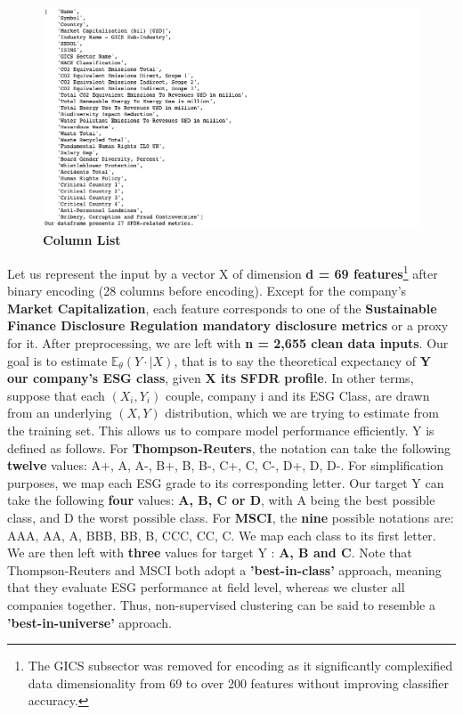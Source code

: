 \documentclass[12pt]{report}
\begin{document}
\begin{figure}[h!]
\centering
\includegraphics[scale=0.3]{columns.png}
\caption{\textbf{Column List}}
\label{fig:columns}
\end{figure}


Let us represent the input by a vector X of dimension \textbf{d = 69 features}\footnote{The GICS subsector was removed for encoding as it significantly complexified data dimensionality from 69 to over 200 features without improving classifier accuracy.} after binary encoding (28 columns before encoding). Except for the company's \textbf{Market Capitalization}, each feature corresponds to one of the \textbf{Sustainable Finance Disclosure Regulation mandatory disclosure metrics} or a proxy for it. After preprocessing, we are left with \textbf{n = 2,655 clean data inputs}.\newline
Our goal is to estimate $\mathbb{E}_\theta(Y \cdot|X)$, that is to say the theoretical expectancy of \textbf{Y our company's ESG class}, given \textbf{X its SFDR profile}. In other terms, suppose that each $(X_{i},Y_{i})$ couple,  company i and its ESG Class, are drawn from an underlying $(X,Y)$ distribution, which we are trying to estimate from the training set. This allows us to compare model performance efficiently.\newline
Y is defined as follows.
For \textbf{Thompson-Reuters}, the notation can take the following \textbf{twelve} values: A+, A, A-, B+, B, B-, C+, C, C-, D+, D, D-. For simplification purposes, we map each ESG grade to its corresponding letter. Our target Y can take the following \textbf{four} values: \textbf{A, B, C or D}, with A being the best possible class, and D the worst possible class.
For \textbf{MSCI}, the \textbf{nine} possible notations are: AAA, AA, A, BBB, BB, B, CCC, CC, C. We map each class to its first letter. We are then left with \textbf{three} values for target Y : \textbf{A, B and C}. Note that Thompson-Reuters and MSCI both adopt a \textbf{'best-in-class'} approach, meaning that they evaluate ESG performance at field level, whereas we cluster all companies together. Thus, non-supervised clustering can be said to resemble a \textbf{'best-in-universe'} approach.\newline
\end{document}
